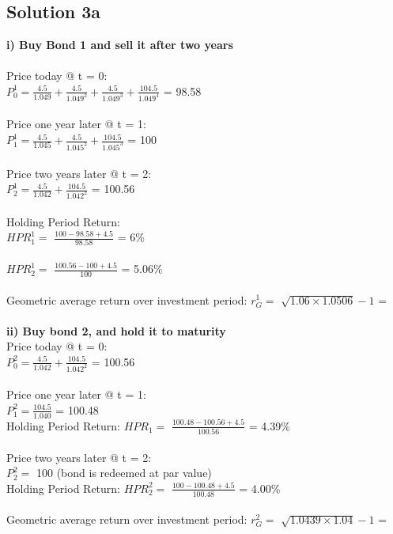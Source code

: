 \documentclass[12]{article}
\begin{document}
\color{blue}
\subsection*{Solution 3a}
\textbf{i) Buy Bond 1 and sell it after two years}\\
\\
Price today @ t = 0:\\
$P_0^{1} = ${\Large $\frac{4.5}{1.049} + \frac{4.5}{1.049^2} + \frac{4.5}{1.049^3} + \frac{104.5}{1.049^4}$} = 98.58\\
\\
Price one year later @ t = 1:\\
$P_1^{1} = ${\Large $\frac{4.5}{1.045} + \frac{4.5}{1.045^2} + \frac{104.5}{1.045^3}$} = 100\\
\\
Price two years later @ t = 2:\\
$P_2^{1} = ${\Large $\frac{4.5}{1.042} + \frac{104.5}{1.042^2}$} = 100.56\\
\\
Holding Period Return: \\
$HPR_1^1 =$ {\Large $\frac{100-98.58 + 4.5}{98.58}$} = 6\%\\
\\
$HPR_2^1 =$ {\Large $\frac{100.56 - 100 + 4.5}{100}$} = 5.06\%\\
\\
Geometric average return over investment period: $r_G^1 =$ $\sqrt{1.06 \times 1.0506} - 1$ = 
\\

\noindent
\\
\textbf{ii) Buy bond 2, and hold it to maturity}\\
Price today @ t = 0:\\
$P_0^{2} = ${\Large $\frac{4.5}{1.042} + \frac{104.5}{1.042^2}$} = 100.56\\
\\
Price one year later @ t = 1:\\
$P_1^{2} = ${\Large $\frac{104.5}{1.040}$} = 100.48\\
Holding Period Return: $HPR_1 =$ {\Large $\frac{100.48 - 100.56 + 4.5}{100.56}$} = 4.39\%\\
\\
Price two years later @ t = 2:\\
$P_2^{2} = $ 100 (bond is redeemed at par value)\\
Holding Period Return: 
$HPR_2^2 =$ {\Large $\frac{100 - 100.48 + 4.5}{100.48}$} = 4.00\%\\
\\
Geometric average return over investment period: $r_G^2 =$ $\sqrt{1.0439 \times 1.04} - 1$ = 
\end{document}
